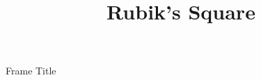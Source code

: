 \documentclass{beamer}
\title{Rubik's Square}
\begin{document}
\maketitle


\begin{frame}{Frame Title}
    
\end{frame}
\end{document}
